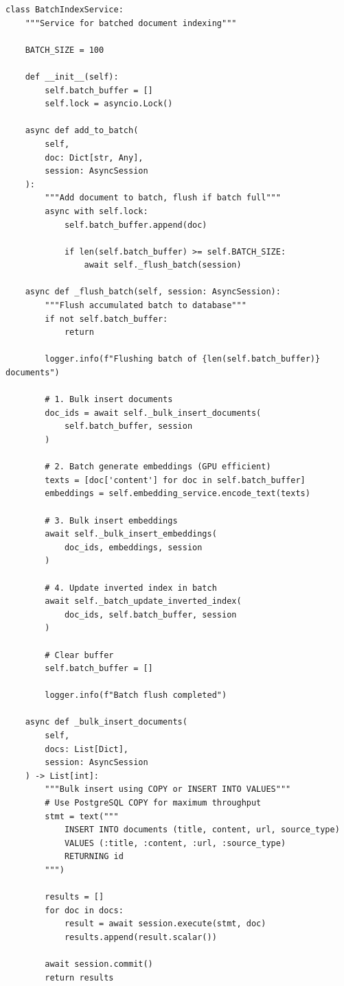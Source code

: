 \begin{lstlisting}
class BatchIndexService:
    """Service for batched document indexing"""
    
    BATCH_SIZE = 100
    
    def __init__(self):
        self.batch_buffer = []
        self.lock = asyncio.Lock()
    
    async def add_to_batch(
        self,
        doc: Dict[str, Any],
        session: AsyncSession
    ):
        """Add document to batch, flush if batch full"""
        async with self.lock:
            self.batch_buffer.append(doc)
            
            if len(self.batch_buffer) >= self.BATCH_SIZE:
                await self._flush_batch(session)
    
    async def _flush_batch(self, session: AsyncSession):
        """Flush accumulated batch to database"""
        if not self.batch_buffer:
            return
        
        logger.info(f"Flushing batch of {len(self.batch_buffer)} documents")
        
        # 1. Bulk insert documents
        doc_ids = await self._bulk_insert_documents(
            self.batch_buffer, session
        )
        
        # 2. Batch generate embeddings (GPU efficient)
        texts = [doc['content'] for doc in self.batch_buffer]
        embeddings = self.embedding_service.encode_text(texts)
        
        # 3. Bulk insert embeddings
        await self._bulk_insert_embeddings(
            doc_ids, embeddings, session
        )
        
        # 4. Update inverted index in batch
        await self._batch_update_inverted_index(
            doc_ids, self.batch_buffer, session
        )
        
        # Clear buffer
        self.batch_buffer = []
        
        logger.info(f"Batch flush completed")
    
    async def _bulk_insert_documents(
        self,
        docs: List[Dict],
        session: AsyncSession
    ) -> List[int]:
        """Bulk insert using COPY or INSERT INTO VALUES"""
        # Use PostgreSQL COPY for maximum throughput
        stmt = text("""
            INSERT INTO documents (title, content, url, source_type)
            VALUES (:title, :content, :url, :source_type)
            RETURNING id
        """)
        
        results = []
        for doc in docs:
            result = await session.execute(stmt, doc)
            results.append(result.scalar())
        
        await session.commit()
        return results
\end{lstlisting}

